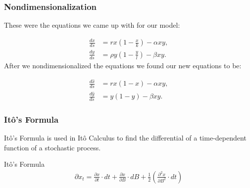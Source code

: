 \documentclass{beamer}
\begin{document}
\begin{frame}
\frametitle{Nondimensionalization}

These were the equations we came up with for our model:

  \begin{align*}
    \frac{dx}{ds} & = rx \left(1-\frac{x}{k}\right) - \alpha xy, \\
    \frac{dy}{ds} & = \rho y \left(1-\frac{y}{l}\right) - \beta xy.
  \end{align*}
After we nondimensionalized the equations we found our new equations to be:

	\begin{align*}
		\frac{d\hat{x}}{ds} &= rx(1-x) - \alpha xy, \\
		\frac{d\hat{y}}{ds} &= y(1-y) - \beta xy.
	\end{align*}
\end{frame}



\begin{frame}
\frametitle{It\^o's Formula}
It\^o's Formula is used in It\^o Calculus to find the differential of a time-dependent function of a stochastic process.

		 \begin{block}{It\^o's Formula}
      \begin{align*}
				\partial x_t = \frac{\partial x}{\partial t} \cdot dt + \frac{\partial x}{\partial B} \cdot dB + \frac{1}{2} \left(\frac{\partial ^2 x}{\partial B ^2} \cdot dt\right)
			\end{align*}
    \end{block}
		
\end{frame}
\end{document}
